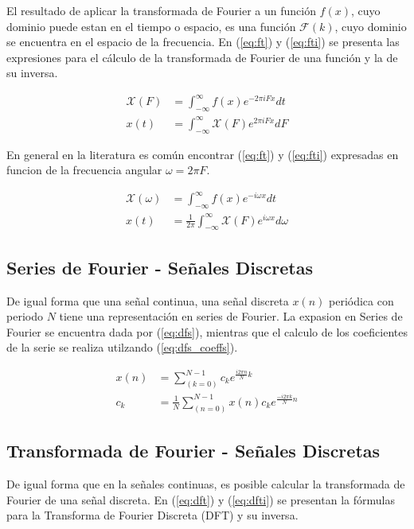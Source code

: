\documentclass[
  letterpaper,
  twocolumn,
  9pt,
  journal,
  final]{IEEEtran}
\begin{document}
El resultado de aplicar la transformada de Fourier a un función $f(x)$, cuyo dominio puede estan en el tiempo o espacio, es una función $\mathcal{F}(k)$, cuyo dominio se encuentra en el espacio de la frecuencia. En (\ref{eq:ft}) y (\ref{eq:fti}) se presenta las expresiones para el cálculo de la transformada de Fourier de una función y la de su inversa.

\begin{align}
	\mathcal{X}(F) &= \int_{-\infty}^{\infty} f(x) e^{-2\pi i F x} dt \label{eq:ft}\\
	x(t) &= \int_{-\infty}^{\infty} \mathcal{X}(F) e^{ 2\pi i F x} dF \label{eq:fti}
\end{align}

En general en la literatura es común encontrar (\ref{eq:ft}) y (\ref{eq:fti}) expresadas en funcion de la frecuencia angular $\omega = 2\pi F$.

\begin{align}
	\mathcal{X}(\omega) &= \int_{-\infty}^{\infty} f(x) e^{-i \omega x} dt \label{eq:ft}\\
	x(t) &= \frac{1}{2\pi} \int_{-\infty}^{\infty} \mathcal{X}(F) e^{i \omega x} d\omega \label{eq:fti}
\end{align}

\subsection{Series de Fourier - Señales Discretas}

De igual forma que una señal continua, una señal discreta $x(n)$ periódica con periodo $N$ tiene una representación en series de Fourier. La expasion en Series de Fourier se encuentra dada por (\ref{eq:dfs}), mientras que el calculo de los coeficientes de la serie se realiza utilzando (\ref{eq:dfs_coeffs}).

\begin{align}
	x(n) &= \sum_(k=0)^{N-1} c_k e^{\frac{i 2 \pi n}{N} k } \label{eq:dfs} \\
	c_k &= \frac{1}{N} \sum_(n=0)^{N-1} x(n) c_k e^{\frac{-i 2 \pi k}{N} n} \label{eq:dfs_coeffs}
\end{align}


\subsection{Transformada de Fourier - Señales Discretas}

De igual forma que en la señales continuas, es posible calcular la transformada de Fourier de una señal discreta. En (\ref{eq:dft}) y (\ref{eq:dfti}) se presentan la fórmulas para la Transforma de Fourier Discreta (DFT) y su inversa.
\end{document}
